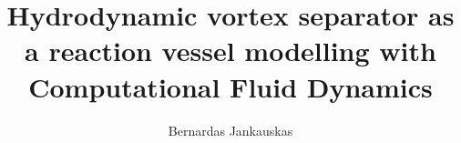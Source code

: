 \documentclass[12pt,reqno,a4paper]{report}
\begin{document}
\title{Hydrodynamic vortex separator as a reaction vessel modelling with Computational Fluid Dynamics} 				%
\author{Bernardas Jankauskas}	%
\titlep 	%


\tableofcontents
\clearpage

\listoffigures
\clearpage

\listoftables










\appendix


\end{document}
